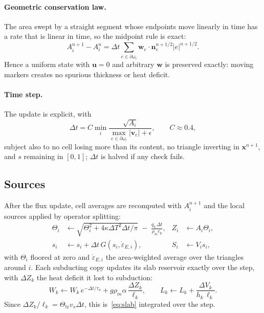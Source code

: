 \documentclass[11pt]{article}
\newcommand{\vect}[1]{\mathbf{#1}}
\newcommand{\edot}{\dot{\varepsilon}}
\begin{document}
\paragraph{Geometric conservation law.} The area swept by a straight segment whose endpoints move linearly in time has a rate that is linear in time, so the midpoint rule is exact:
\begin{equation}
  A_i^{n+1}-A_i^n=\Delta t\sum_{e\in\partial\omega_i}\vect{w}_e\cdot\vect{n}_e^{n+1/2}|e|^{n+1/2}.
\end{equation}
Hence a uniform state with $\vect{u}=0$ and arbitrary $\vect{w}$ is preserved exactly: moving markers creates no spurious thickness or heat deficit.

\paragraph{Time step.} The update is explicit, with
\begin{equation}
  \Delta t=C\min_i\frac{\sqrt{A_i}}{\max_{e\in\partial\omega_i}|\vect{v}_e|+\epsilon},\qquad C\approx0.4,
\end{equation}
subject also to no cell losing more than its content, no triangle inverting in $\vect{x}^{n+1}$, and $s$ remaining in $[0,1]$; $\Delta t$ is halved if any check fails.

\subsection{Sources}
\label{sec:sources}
After the flux update, cell averages are recomputed with $A_i^{n+1}$ and the local sources applied by operator splitting:
\begin{align}
  \Theta_i &\gets \sqrt{\Theta_i^2+4\kappa\Delta T^2\Delta t/\pi}\;-\;\frac{q_b\,\Delta t}{\rho_mc_p},
  & Z_i&\gets A_i\Theta_i, \label{eq:thsource}\\
  s_i &\gets s_i+\Delta t\,G(s_i,\edot_{E,i}),
  & S_i&\gets V_is_i,
\end{align}
with $\Theta_i$ floored at zero and $\edot_{E,i}$ the area-weighted average over the triangles around $i$. Each subducting copy updates its slab reservoir exactly over the step, with $\Delta Z_k$ the heat deficit it lost to subduction:
\begin{equation}
  W_k\gets W_k\,e^{-\Delta t/\tau_a}+g\rho_m\alpha\,\frac{\Delta Z_k}{\ell_k},\qquad
  L_k\gets L_k+\frac{\Delta V_k}{h_k\,\ell_k}.
\end{equation}
Since $\Delta Z_k/\ell_k=\Theta_{\mathrm{tr}}v_s\Delta t$, this is~\eqref{eq:slab} integrated over the step.
\end{document}
